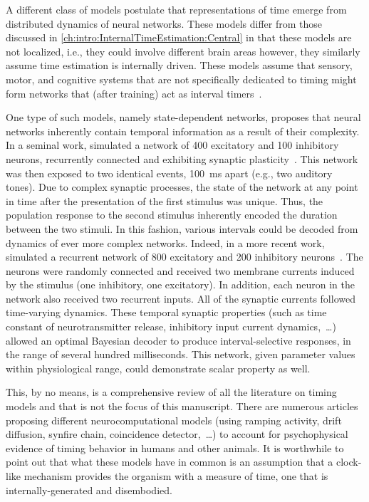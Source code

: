 A different class of models postulate that representations of time emerge from distributed dynamics of neural networks.
These models differ from those discussed in \autoref{ch:intro:InternalTimeEstimation:Central} in that these models are not localized, i.e., they could involve different brain areas however, they similarly assume time estimation is internally driven.
These models assume that sensory, motor, and cognitive systems that are not specifically dedicated to timing might form networks that (after training) act as interval timers~\cite{Wittmann2013NatRevNeurosci}.
\par
One type of such models, namely state-dependent networks, proposes that neural networks inherently contain temporal information as a result of their complexity.
In a seminal work, \citeauthor{Karmarkar2007Neuron} simulated a network of 400 excitatory and 100 inhibitory neurons, recurrently connected and exhibiting synaptic plasticity~\cite{Karmarkar2007Neuron}.
This network was then exposed to two identical events, 100~ms apart (e.g., two auditory tones).
Due to complex synaptic processes, the state of the network at any point in time after the presentation of the first stimulus was unique.
Thus, the population response to the second stimulus inherently encoded the duration between the two stimuli.
In this fashion, various intervals could be decoded from dynamics of ever more complex networks.
Indeed, in a more recent work, \citeauthor{Perez2018JNeurosci} simulated a recurrent network of 800 excitatory and 200 inhibitory neurons~\cite{Perez2018JNeurosci}.
The neurons were randomly connected and received two membrane currents induced by the stimulus (one inhibitory, one excitatory).
In addition, each neuron in the network also received two recurrent inputs.
All of the synaptic currents followed time-varying dynamics.
These temporal synaptic properties (such as time constant of neurotransmitter release, inhibitory input current dynamics,~\ldots) allowed an optimal Bayesian decoder to produce interval-selective responses, in the range of several hundred milliseconds.
This network, given parameter values within physiological range, could demonstrate scalar property as well.
\par
This, by no means, is a comprehensive review of all the literature on timing models and that is not the focus of this manuscript.
There are numerous articles proposing different neurocomputational models (using ramping activity, drift diffusion, synfire chain, coincidence detector,~\ldots) to account for psychophysical evidence of timing behavior in humans and other animals.
It is worthwhile to point out that what these models have in common is an assumption that a clock-like mechanism provides the organism with a measure of time, one that is internally-generated and disembodied.
